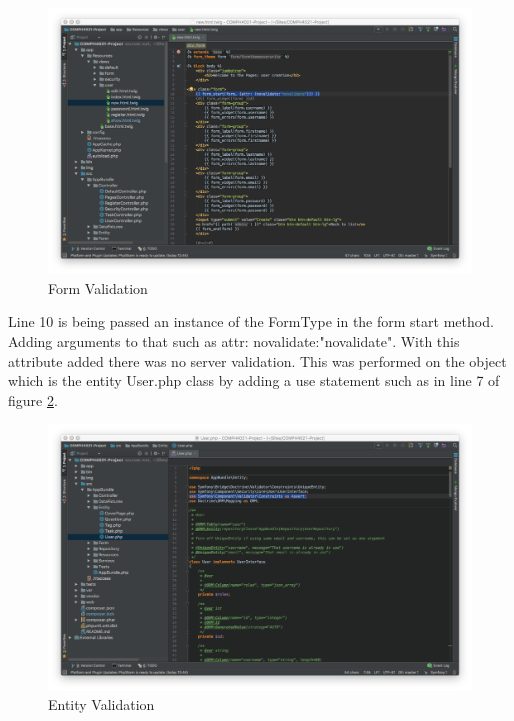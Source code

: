 \begin{figure}[htbp]
   \centering
   \includegraphics[width=400pt]{figures/form_validation.png} %
   \caption{Form Validation}
   \label{fig:Form Validation}
\end{figure}

Line 10 is being passed an instance of the FormType in the form start method. Adding arguments to that such as {attr: {novalidate:"novalidate"}}. With this attribute added there was no server validation. This was performed on the object which is the entity User.php class by adding a use statement such as in line 7 of figure \ref{fig:Entity Validation}. 

\begin{figure}[htbp]
   \centering
   \includegraphics[width=400pt]{figures/entity_validation.png} %
   \caption{Entity Validation}
   \label{fig:Entity Validation}
\end{figure}


